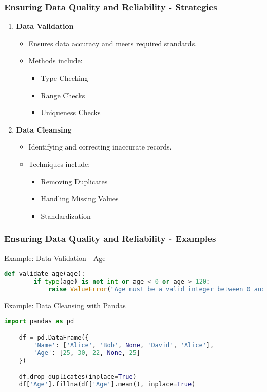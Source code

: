 \documentclass{beamer}
\begin{document}
\begin{frame}[fragile]
    \frametitle{Ensuring Data Quality and Reliability - Strategies}
    \begin{enumerate}
        \item \textbf{Data Validation}
            \begin{itemize}
                \item Ensures data accuracy and meets required standards.
                \item Methods include:
                    \begin{itemize}
                        \item Type Checking
                        \item Range Checks
                        \item Uniqueness Checks
                    \end{itemize}
            \end{itemize}
        \item \textbf{Data Cleansing}
            \begin{itemize}
                \item Identifying and correcting inaccurate records.
                \item Techniques include:
                    \begin{itemize}
                        \item Removing Duplicates
                        \item Handling Missing Values
                        \item Standardization
                    \end{itemize}
            \end{itemize}
    \end{enumerate}
\end{frame}

\begin{frame}[fragile]
    \frametitle{Ensuring Data Quality and Reliability - Examples}
    \begin{block}{Example: Data Validation - Age}
    \begin{lstlisting}[language=python]
    def validate_age(age):
        if type(age) is not int or age < 0 or age > 120:
            raise ValueError("Age must be a valid integer between 0 and 120.")
    \end{lstlisting}
    \end{block}

    \begin{block}{Example: Data Cleansing with Pandas}
    \begin{lstlisting}[language=python]
    import pandas as pd

    df = pd.DataFrame({
        'Name': ['Alice', 'Bob', None, 'David', 'Alice'],
        'Age': [25, 30, 22, None, 25]
    })

    df.drop_duplicates(inplace=True)
    df['Age'].fillna(df['Age'].mean(), inplace=True)
    \end{lstlisting}
    \end{block}
\end{frame}
\end{document}
